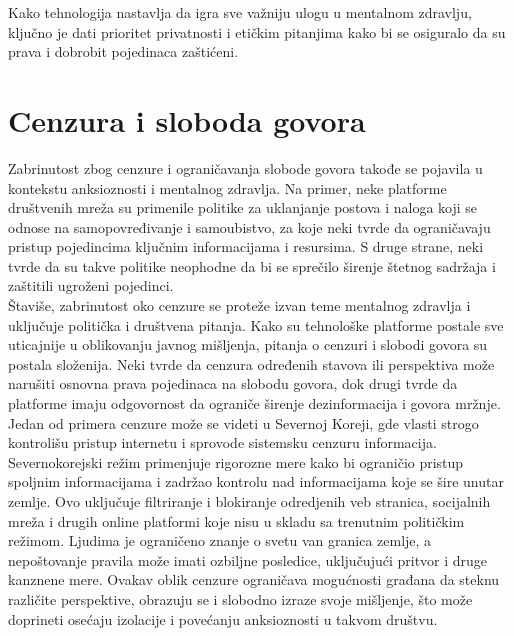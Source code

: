\documentclass[a4paper]{article}
\begin{document}
        Kako tehnologija nastavlja da igra sve važniju ulogu u mentalnom zdravlju, ključno je dati prioritet privatnosti i etičkim pitanjima kako bi se osiguralo da su prava i dobrobit pojedinaca zaštićeni.

              \section{Cenzura i sloboda govora}
             \label{sec:naslovCenzura}

             Zabrinutost zbog cenzure i ograničavanja slobode govora takođe se pojavila u kontekstu anksioznosti i mentalnog zdravlja. Na primer, neke platforme društvenih mreža su primenile politike za uklanjanje postova i naloga koji se odnose na samopovređivanje i samoubistvo, za koje neki tvrde da ograničavaju pristup pojedincima ključnim informacijama i resursima. S druge strane, neki tvrde da su takve politike neophodne da bi se sprečilo širenje štetnog sadržaja i zaštitili ugroženi pojedinci. \\
            
             Štaviše, zabrinutost oko cenzure se proteže izvan teme mentalnog zdravlja i uključuje politička i društvena pitanja. Kako su tehnološke platforme postale sve uticajnije u oblikovanju javnog mišljenja, pitanja o cenzuri i slobodi govora su postala složenija. Neki tvrde da cenzura određenih stavova ili perspektiva može narušiti osnovna prava pojedinaca na slobodu govora, dok drugi tvrde da platforme imaju odgovornost da ograniče širenje dezinformacija i govora mržnje.\\

             Jedan od primera cenzure može se videti u Severnoj Koreji, gde vlasti strogo kontrolišu pristup internetu i sprovode sistemsku cenzuru informacija. Severnokorejski režim primenjuje rigorozne mere kako bi ograničio pristup spoljnim informacijama i zadržao kontrolu nad informacijama koje se šire unutar zemlje. Ovo uključuje filtriranje i blokiranje odredjenih veb stranica, socijalnih mreža i drugih online platformi koje nisu u skladu sa trenutnim političkim režimom. Ljudima je ograničeno znanje o svetu van granica zemlje, a nepoštovanje pravila može imati ozbiljne posledice, uključujući pritvor i druge kanznene mere. Ovakav oblik cenzure ograničava mogućnosti građana da steknu različite perspektive, obrazuju se i slobodno izraze svoje mišljenje, što može doprineti osećaju izolacije i povećanju anksioznosti u takvom društvu.

        
\end{document}

